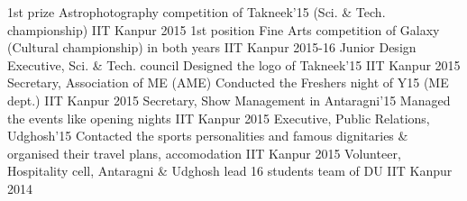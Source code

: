 \begin{cvhonors}
  \cvhonor
    {1st prize}
    {Astrophotography competition of Takneek’15 (Sci. \& Tech. championship)}
    {IIT Kanpur}
    {2015}
  \cvhonor
    {1st position}
    {Fine Arts competition of Galaxy (Cultural championship) in both years}
    {IIT Kanpur}
    {2015-16}
  \cvhonor
    {Junior Design Executive, Sci. \& Tech. council}
    {Designed the logo of Takneek’15}
    {IIT Kanpur}
    {2015}
  \cvhonor
    {Secretary, Association of ME (AME)}
    {Conducted the Freshers night of Y15 (ME dept.)}
    {IIT Kanpur}
    {2015}
  \cvhonor
    {Secretary, Show Management in Antaragni'15}
    {Managed the events like opening nights}
    {IIT Kanpur}
    {2015}
  \cvhonor
    {Executive, Public Relations, Udghosh'15}
    {Contacted the sports personalities and famous dignitaries \& organised their travel plans, accomodation}
    {IIT Kanpur}
    {2015}
  \cvhonor
    {Volunteer, Hospitality cell, Antaragni \& Udghosh}
    {lead 16 students team of DU}
    {IIT Kanpur}
    {2014}
\end{cvhonors}
